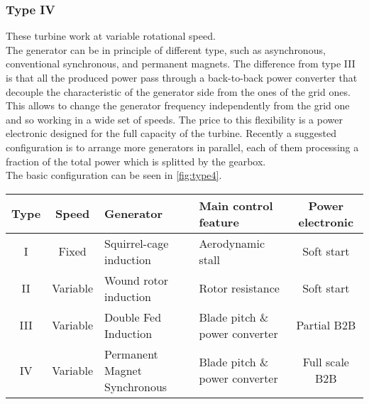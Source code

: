 \subsubsection{Type IV}
These turbine work at variable rotational speed. \\
The generator can be in principle of different type, such as asynchronous, conventional synchronous, and permanent magnets. The difference from type III is that all the produced power pass through a back-to-back power converter that decouple the characteristic of the generator side from the ones of the grid ones. This allows to change the generator frequency independently from the grid one and so working in a wide set of speeds. The price to this flexibility is a power electronic designed for the full capacity of the turbine. Recently a suggested configuration is to arrange more generators in parallel, each of them processing a fraction of the total power which is splitted by the gearbox. \\
The basic configuration can be seen in \autoref{fig:type4}.


\begin{table}[htb]
  \centering
  \begin{tabular}{ccMMc}
    \toprule
  Type & Speed & Generator & Main control feature & Power electronic\\ \midrule
   I & Fixed & Squirrel-cage induction & Aerodynamic stall & Soft start \\ 
   II & Variable & Wound rotor induction &  Rotor resistance & Soft start\\
   III & Variable & Double Fed Induction &  Blade pitch \& power converter & Partial B2B\\
   IV & Variable & Permanent Magnet Synchronous &  Blade pitch \& power converter & Full scale B2B\\
   \bottomrule
  \end{tabular}
\end{table}

